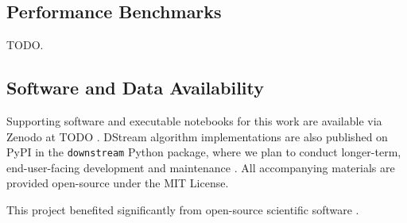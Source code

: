 \subsection{Performance Benchmarks}

TODO.

\subsection{Software and Data Availability} \label{sec:materials}

Supporting software and executable notebooks for this work are available via Zenodo at TODO \citep{moreno2024hsurf}.
DStream algorithm implementations are also published on PyPI in the \texttt{downstream} Python package, where we plan to conduct longer-term, end-user-facing development and maintenance \citep{moreno2024downstream}.
All accompanying materials are provided open-source under the MIT License.

This project benefited significantly from open-source scientific software \citep{2020SciPy-NMeth,harris2020array,reback2020pandas,mckinney-proc-scipy-2010,waskom2021seaborn,hunter2007matplotlib,moreno2023teeplot}.
